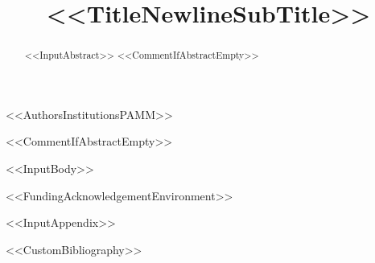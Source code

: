 \documentclass[%
pamm,
a4paper,
fleqn,
<<DocumentClassOptions>>]{w-art}
\begin{document}
\TitleLanguage[EN]
\title[<<ShortTitle>>]{<<TitleNewlineSubTitle>>}

<<AuthorsInstitutionsPAMM>>


\AbstractLanguage[EN]
<<CommentIfAbstractEmpty>>\begin{abstract}
<<InputAbstract>>
<<CommentIfAbstractEmpty>>\end{abstract}

\maketitle

<<InputBody>>

<<FundingAcknowledgementEnvironment>>

\appendix
<<InputAppendix>>


<<CustomBibliography>>
\end{document}
